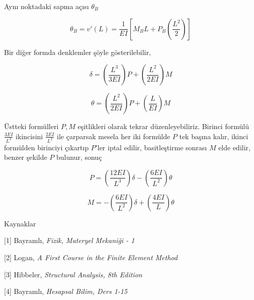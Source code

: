 \documentclass[12pt,fleqn]{article}\usepackage{../../common}
\begin{document}
Aynı noktadaki sapma açısı $\theta_B$

$$
\theta_B = v'(L) =
\frac{1}{EI} \left[
M_B L + P_B \left( \frac{L^2}{2} \right) 
\right]
$$

Bir diğer formda denklemler şöyle gösterilebilir,

$$
\delta = \left( \frac{L^3}{3EI} \right) P +
\left( \frac{L^2}{2EI} \right) M
$$

$$
\theta = \left( \frac{L^2}{2EI} \right) P +
\left( \frac{L}{EI} \right) M
$$

Üstteki formülleri $P,M$ eşitlikleri olarak tekrar düzenleyebiliriz.
Birinci formülü $\frac{3EI}{L^3}$ ikincisini $\frac{2EI}{L^2}$ ile
çarparsak mesela her iki formülde $P$ tek başına kalır, ikinci formülden
birinciyi çıkartıp $P$'ler iptal edilir, basitleştirme sonrası $M$ elde
edilir, benzer şekilde $P$ bulunur, sonuç

$$
P = \left( \frac{12EI}{L^3}  \right) \delta -
\left(  \frac{6EI}{L^2} \right) \theta
$$

$$
M = - \left( \frac{6 EI}{L^2}  \right) \delta +
\left( \frac{4 EI}{L}  \right) \theta
$$

Kaynaklar

[1] Bayramlı, {\em Fizik, Materyel Mekaniği - 1}

[2] Logan, {\em A First Course in the Finite Element Method}

[3] Hibbeler, {\em Structural Analysis, 8th Edition}

[4] Bayramlı, {\em Hesapsal Bilim, Ders 1-15}
\end{document}
